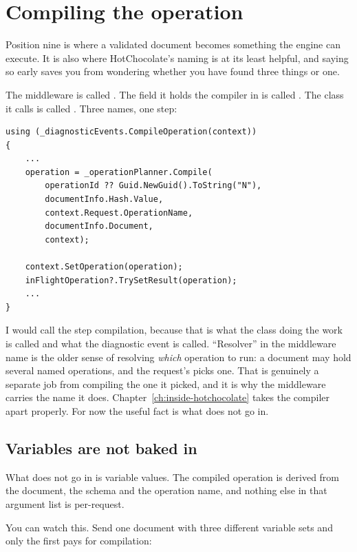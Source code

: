 \section{Compiling the operation}
\label{sec:ch03-compiling}

Position nine is where a validated document becomes something the engine can
execute. It is also where HotChocolate's naming is at its least helpful, and
saying so early saves you from wondering whether you have found three things or
one.

The middleware is called . The field it holds
the compiler in is called . The class it calls is
called . Three names, one step:

\begin{verbatim}
using (_diagnosticEvents.CompileOperation(context))
{
    ...
    operation = _operationPlanner.Compile(
        operationId ?? Guid.NewGuid().ToString("N"),
        documentInfo.Hash.Value,
        context.Request.OperationName,
        documentInfo.Document,
        context);

    context.SetOperation(operation);
    inFlightOperation?.TrySetResult(operation);
    ...
}
\end{verbatim}

I would call the step compilation, because that is what the class doing the work
is called and what the diagnostic event is called. \enquote{Resolver} in the
middleware name is the older sense of resolving \emph{which} operation to run:
a document may hold several named operations, and the request's
 picks one. That is genuinely a separate job from compiling
the one it picked, and it is why the middleware carries the name it does.
Chapter~\ref{ch:inside-hotchocolate} takes the compiler apart properly. For now
the useful fact is what does not go in.

\subsection*{Variables are not baked in}

%
What does not go in is variable values. The compiled operation is derived from
the document, the schema and the operation name, and nothing else in that
argument list is per-request.

You can watch this. Send one document with three different variable sets and
only the first pays for compilation:

